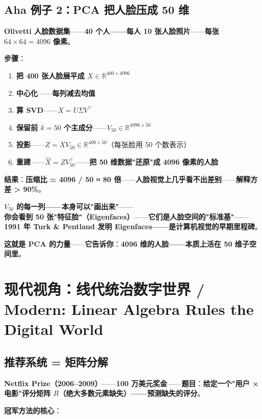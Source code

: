 \subsection{Aha 例子 2：PCA 把人脸压成 50 维}

\textbf{Olivetti 人脸数据集}——\textbf{40 个人——每人 10 张人脸照片}——\textbf{每张 $64 \times 64 = 4096$ 像素}。

\textbf{步骤}：

\begin{enumerate}
\item \textbf{把 400 张人脸展平成 $X \in \mathbb{R}^{400 \times 4096}$}
\item \textbf{中心化}——\textbf{每列减去均值}
\item \textbf{算 SVD}——\textbf{$X = U \Sigma V^{\!\top}$}
\item \textbf{保留前 $k = 50$ 个主成分}——\textbf{$V_{50} \in \mathbb{R}^{4096 \times 50}$}
\item \textbf{投影}——\textbf{$Z = X V_{50} \in \mathbb{R}^{400 \times 50}$}（每张脸用 50 个数表示）
\item \textbf{重建}——\textbf{$\hat{X} = Z V_{50}^{\!\top}$}——\textbf{把 50 维数据"还原"成 4096 像素的人脸}
\end{enumerate}

\textbf{结果}：\textbf{压缩比 = 4096 / 50 ≈ 80 倍}——\textbf{人脸视觉上几乎看不出差别}——\textbf{解释方差 > 90\%}。

\textbf{$V_{50}$ 的每一列——本身可以"画出来"}——\textbf{你会看到 50 张"特征脸"（Eigenfaces）}——\textbf{它们是人脸空间的"标准基"}——\textbf{1991 年 Turk \& Pentland 发明 Eigenfaces——是计算机视觉的早期里程碑}。

\textbf{这就是 PCA 的力量}——\textbf{它告诉你}：\textbf{4096 维的人脸——本质上活在 50 维子空间里}。

\section{现代视角：线代统治数字世界 / Modern: Linear Algebra Rules the Digital World}

\subsection{推荐系统 = 矩阵分解}

\textbf{Netflix Prize（2006--2009）}——\textbf{100 万美元奖金}——\textbf{题目}：\textbf{给定一个"用户 × 电影"评分矩阵 $R$（绝大多数元素缺失）——预测缺失的评分}。

\textbf{冠军方法的核心}：

